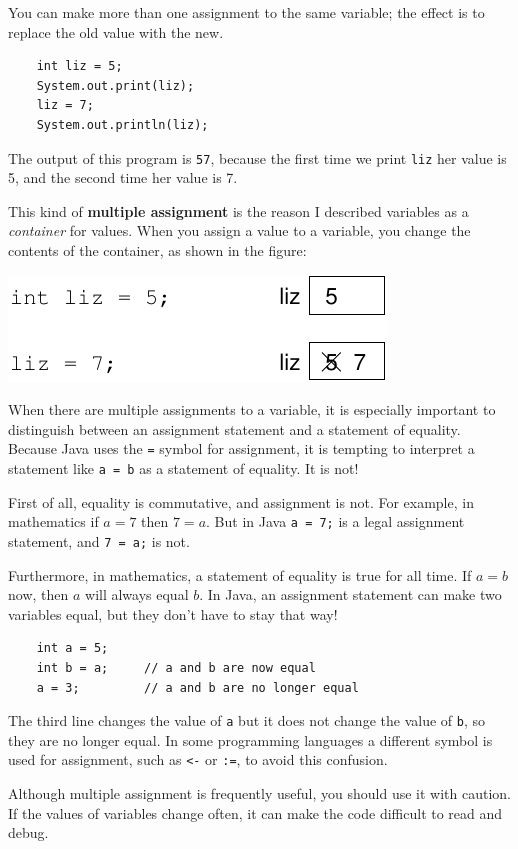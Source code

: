 \documentclass[12pt]{book}
\theoremstyle{exercise}
\begin{document}
You can make more than one assignment to the same variable;
the effect is to replace the old value with the new.

\begin{lstlisting}
    int liz = 5;
    System.out.print(liz);
    liz = 7;
    System.out.println(liz);
\end{lstlisting}
%
The output of this program is {\tt 57}, because the first
time we print {\tt liz} her value is 5, and the second time
her value is 7.

This kind of {\bf multiple assignment} is the reason I
described variables as a {\em container} for values.  When
you assign a value to a variable, you change the contents of
the container, as shown in the figure:


\includegraphics{figs/assign2.pdf}


When there are multiple assignments to a variable, it is especially
important to distinguish between an assignment statement and a
statement of equality.  Because Java uses the {\tt =} symbol for
assignment, it is tempting to interpret a statement like {\tt a = b}
as a statement of equality.  It is not!

First of all, equality is commutative, and assignment is not.
For example, in mathematics if $a = 7$ then $7 = a$.  But in
Java {\tt a = 7;} is a legal assignment statement, and {\tt 7 = a;}
is not.

Furthermore, in mathematics, a statement of equality is true
for all time.  If $a = b$ now, then $a$ will always equal $b$.
In Java, an assignment statement can make two variables equal,
but they don't have to stay that way!

\begin{lstlisting}
    int a = 5;
    int b = a;     // a and b are now equal
    a = 3;         // a and b are no longer equal
\end{lstlisting}
%
The third line changes the value of {\tt a} but it does not
change the value of {\tt b}, so they are no longer equal.
In some programming languages a different symbol is used
for assignment, such as {\tt <-} or {\tt :=}, to
avoid this confusion.

Although multiple assignment is frequently useful, you should use it
with caution.  If the values of variables change often, it can make
the code difficult to read and debug.
\end{document}
